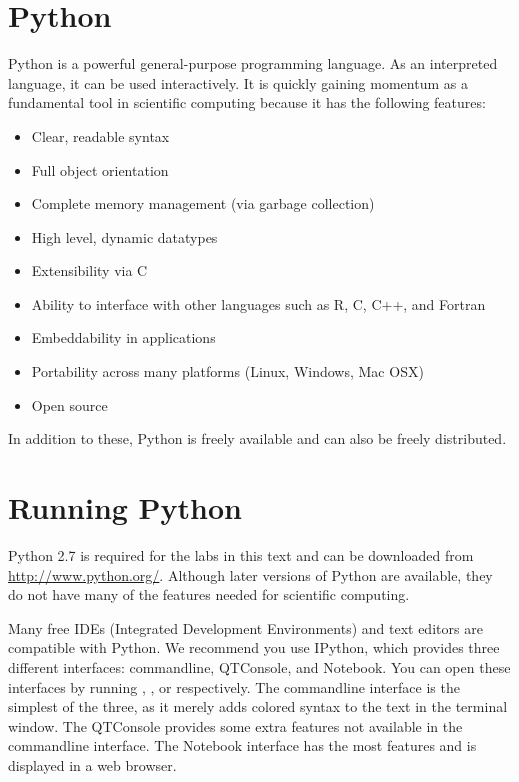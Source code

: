 \label{lab:Essential_Python}

\section*{Python}
Python is a powerful general-purpose programming language. As an interpreted
language, it can be used interactively. 
It is quickly gaining momentum as a fundamental tool in scientific computing because it has the following features:
\begin{itemize}
\item Clear, readable syntax
\item Full object orientation
\item Complete memory management (via garbage collection)
\item High level, dynamic datatypes
\item Extensibility via C
\item Ability to interface with other languages such as R, C, C++, and Fortran
\item Embeddability in applications
\item Portability across many platforms (Linux, Windows, Mac OSX)
\item Open source
\end{itemize}
In addition to these, Python is freely available and can also be freely distributed.

\section*{Running Python}
Python 2.7 is required for the labs in this text and can be downloaded from \url{http://www.python.org/}. Although later versions of 
Python are available, they do not have many of the features needed for scientific computing. 

Many free IDEs (Integrated Development Environments) and text editors are compatible with Python. We recommend you use IPython, which provides three different interfaces: commandline, QTConsole, and Notebook. You can open these interfaces by running , , or  respectively.
The commandline interface is the simplest of the three, as it merely adds colored syntax to the text in the terminal window.
The QTConsole provides some extra features not available in the commandline interface.
The Notebook interface has the most features and is displayed in a web browser.

